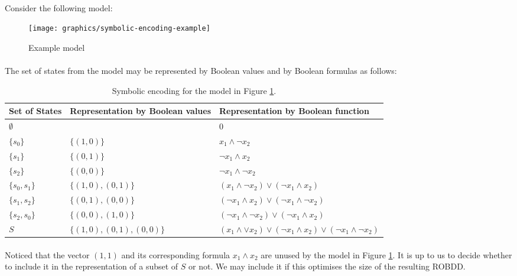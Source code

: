 \documentclass{article}
\theoremstyle{plain}
\theoremstyle{definition}
\begin{document}
\begin{multicols}{2}
\paragraph{} Consider the following model:

\begin{figure}[H]
\centering
\texttt{[image: graphics/symbolic-encoding-example]}
\caption{Example model}\label{fig:SymbolicModelExample}
\end{figure}

\paragraph{} The set of states from the model may be represented by Boolean values and by Boolean formulas as follows:

\begin{table}[H]
\centering\footnotesize
\bgroup
\def\arraystretch{1.5}
\begin{tabular}{ p{0.8cm} | p{2.4cm} p{3.2cm} }
Set of States & Representation by Boolean values & Representation by Boolean function\\
\hline
\hline

$\emptyset$ & & 0\\
\hline
$\{s_0\}$ & $\{(1, 0)\}$ & $x_1 \land \lnot x_2$\\
$\{s_1\}$ & $\{(0, 1)\}$ & $\lnot x_1 \land x_2$\\
$\{s_2\}$ & $\{(0, 0)\}$ & $\lnot x_1 \land \lnot x_2$\\
\hline
$\{s_0, s_1\}$ & $\{(1, 0), (0, 1)\}$ & $(x_1 \land \lnot x_2) \lor (\lnot x_1 \land x_2)$\\
$\{s_1, s_2\}$ & $\{(0, 1), (0, 0)\}$ & $(\lnot x_1 \land x_2) \lor (\lnot x_1 \land \lnot x_2)$\\
$\{s_2, s_0\}$ & $\{(0, 0), (1, 0)\}$ & $(\lnot x_1 \land \lnot x_2) \lor (\lnot x_1 \land x_2)$\\
\hline
$S$ & $\{(1, 0), (0, 1), (0, 0)\}$ & $(x_1 \land \lor x_2) \lor (\lnot x_1 \land x_2) \lor (\lnot x_1 \land \lnot x_2)$\\

\end{tabular}
\egroup
\caption{Symbolic encoding for the model in Figure \ref{fig:SymbolicModelExample}.}
\end{table}

\paragraph{} Noticed that the vector $(1, 1)$ and its corresponding formula $x_1 \land x_2$ are unused by the model in Figure \ref{fig:SymbolicModelExample}. It is up to us to decide whether to include it in the representation of a subset of $S$ or not. We may include it if this optimises the size of the resulting ROBDD.


\end{multicols}
\end{document}
